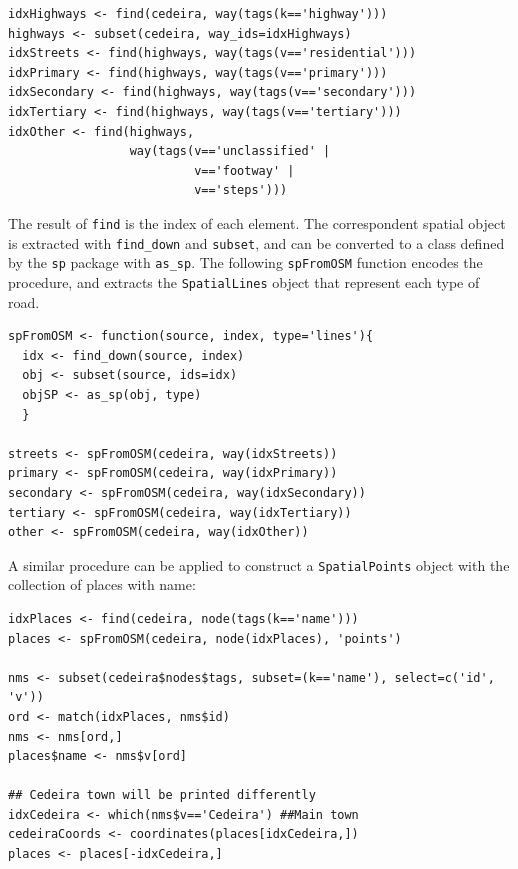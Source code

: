 \documentclass[smallroyalvopaper]{memoir}
\begin{document}

\lstset{language=R,numbers=none}
\begin{lstlisting}
idxHighways <- find(cedeira, way(tags(k=='highway')))
highways <- subset(cedeira, way_ids=idxHighways)
idxStreets <- find(highways, way(tags(v=='residential')))
idxPrimary <- find(highways, way(tags(v=='primary')))
idxSecondary <- find(highways, way(tags(v=='secondary')))
idxTertiary <- find(highways, way(tags(v=='tertiary')))
idxOther <- find(highways,
                 way(tags(v=='unclassified' |
                          v=='footway' |
                          v=='steps')))
\end{lstlisting}

The result of \texttt{find} is the index of each element. The correspondent
spatial object is extracted with \texttt{find\_down} and \texttt{subset}, and can be
converted to a class defined by the \texttt{sp} package with \texttt{as\_sp}. The
following \texttt{spFromOSM} function encodes the procedure, and extracts the
\texttt{SpatialLines} object that represent each type of road.


\lstset{language=R,numbers=none}
\begin{lstlisting}
spFromOSM <- function(source, index, type='lines'){
  idx <- find_down(source, index)
  obj <- subset(source, ids=idx)
  objSP <- as_sp(obj, type)
  }

streets <- spFromOSM(cedeira, way(idxStreets))
primary <- spFromOSM(cedeira, way(idxPrimary))
secondary <- spFromOSM(cedeira, way(idxSecondary))
tertiary <- spFromOSM(cedeira, way(idxTertiary))
other <- spFromOSM(cedeira, way(idxOther))
\end{lstlisting}

A similar procedure can be applied to construct a \texttt{SpatialPoints}
object with the collection of places with name:


\lstset{language=R,numbers=none}
\begin{lstlisting}
idxPlaces <- find(cedeira, node(tags(k=='name')))
places <- spFromOSM(cedeira, node(idxPlaces), 'points')

nms <- subset(cedeira$nodes$tags, subset=(k=='name'), select=c('id', 'v'))
ord <- match(idxPlaces, nms$id)
nms <- nms[ord,]
places$name <- nms$v[ord]

## Cedeira town will be printed differently
idxCedeira <- which(nms$v=='Cedeira') ##Main town
cedeiraCoords <- coordinates(places[idxCedeira,])
places <- places[-idxCedeira,]
\end{lstlisting}
\end{document}
